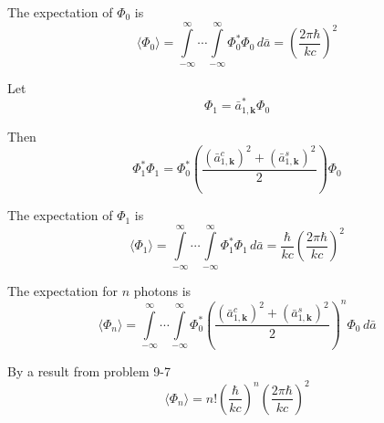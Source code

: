 \documentclass[12pt]{article}
\begin{document}
The expectation of $\Phi_0$ is
\begin{equation*}
\langle\Phi_0\rangle=
\int\limits_{-\infty}^\infty\cdots
\int\limits_{-\infty}^\infty
\Phi_0^*\Phi_0
\,d\bar a
=\left(\frac{2\pi\hbar}{kc}\right)^2
\tag{1}
\end{equation*}

Let
\begin{equation*}
\Phi_1=\bar a_{1,\mathbf k}^*\Phi_0
\end{equation*}

Then
\begin{equation*}
\Phi_1^*\Phi_1=\Phi_0^*\left(\frac{(\bar a_{1,\mathbf k}^c)^2+(\bar a_{1,\mathbf k}^s)^2}{2}\right)\Phi_0
\end{equation*}

The expectation of $\Phi_1$ is
\begin{equation*}
\langle\Phi_1\rangle=
\int\limits_{-\infty}^\infty\cdots
\int\limits_{-\infty}^\infty
\Phi_1^*\Phi_1
\,d\bar a
=\frac{\hbar}{kc}
\left(\frac{2\pi\hbar}{kc}\right)^2
\tag{2}
\end{equation*}

The expectation for $n$ photons is
\begin{equation*}
\langle\Phi_n\rangle=
\int\limits_{-\infty}^\infty\cdots
\int\limits_{-\infty}^\infty
\Phi_0^*\left(\frac{(\bar a_{1,\mathbf k}^c)^2+(\bar a_{1,\mathbf k}^s)^2}{2}\right)^n\Phi_0
\,d\bar a
\end{equation*}

By a result from problem 9-7
\begin{equation*}
\langle\Phi_n\rangle=n!\left(\frac{\hbar}{kc}\right)^n
\left(\frac{2\pi\hbar}{kc}\right)^2
\tag{3}
\end{equation*}
\end{document}
